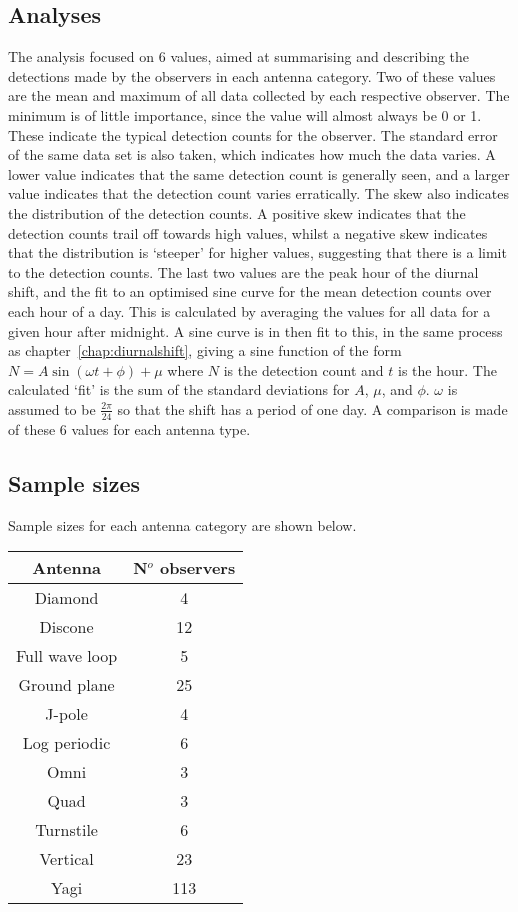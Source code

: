 \subsection{Analyses}
The analysis focused on 6 values, aimed at summarising and describing the detections made by the observers in each antenna category. Two of these values are the mean and maximum of all data collected by each respective observer. The minimum is of little importance, since the value will almost always be 0 or 1. These indicate the typical detection counts for the observer. The standard error of the same data set is also taken, which indicates how much the data varies. A lower value indicates that the same detection count is generally seen, and a larger value indicates that the detection count varies erratically. The skew also indicates the distribution of the detection counts. A positive skew indicates that the detection counts trail off towards high values, whilst a negative skew indicates that the distribution is `steeper' for higher values, suggesting that there is a limit to the detection counts. The last two values are the peak hour of the diurnal shift, and the fit to an optimised sine curve for the mean detection counts over each hour of a day. This is calculated by averaging the values for all data for a given hour after midnight. A sine curve is in then fit to this, in the same process as chapter~\ref{chap:diurnalshift}, giving a sine function of the form $N = A \sin \left( \omega t + \phi \right) + \mu$ where $N$ is the detection count and $t$ is the hour. The calculated `fit' is the sum of the standard deviations for $A$, $\mu$, and $\phi$. $\omega$ is assumed to be $\frac{2\pi}{24}$ so that the shift has a period of one day. A comparison is made of these 6 values for each antenna type.
\subsection{Sample sizes}
Sample sizes for each antenna category are shown below.
\begin{table}[h!]
	\begin{tabular}{cc}
		\hline
		Antenna & N$^o$ observers \\ \hline
		Diamond & 4 \\
		Discone & 12 \\
		Full wave loop & 5 \\
		Ground plane & 25 \\
		J-pole & 4 \\
		Log periodic & 6 \\
		Omni & 3 \\
		Quad & 3 \\
		Turnstile & 6 \\
		Vertical & 23 \\
		Yagi & 113 \\
		\hline
	\end{tabular}
\end{table}

